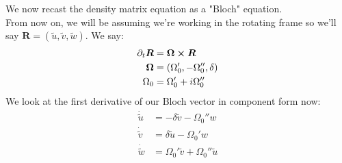 We now recast the density matrix equation as a "Bloch" equation. \\
From now on, we will be assuming we're working in the rotating frame so we'll say $\bm{R} = (\tilde{u},\tilde{v},\tilde{w})$. We say:
\begin{align*}
	\partial_t \bm{R} &= \bm{\Omega} \cross \bm{R} \\
	\bm{\Omega} &= (\Omega_0',-\Omega_0'',\delta) \\
	\Omega_0 &= \Omega_0' + i\Omega_0''
\end{align*}
We look at the first derivative of our Bloch vector in component form now:
\begin{align*}
	\dot{\tilde{u}} &= -\delta\tilde{v} - \Omega_0''w \\
	\dot{\tilde{v}} &= \delta \tilde{u} - \Omega_0' w \\
	\dot{\tilde{w}} &= \Omega_0' \tilde{v} + \Omega_0''\tilde{u}
\end{align*}

